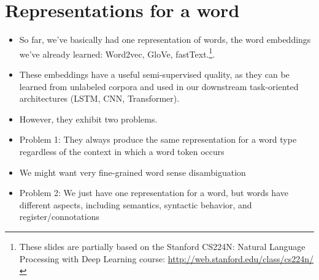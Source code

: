 \section{Representations for a word}
\begin{itemize}
\item So far, we've basically had one representation of words, the word embeddings we've already learned:  Word2vec, GloVe, fastText.\footnote{These slides are partially based on the Stanford CS224N: Natural Language Processing with Deep Learning course: \url{http://web.stanford.edu/class/cs224n/}}.
\item These embeddings have a useful semi-supervised quality, as they can be learned from unlabeled corpora and used in our downstream task-oriented architectures (LSTM, CNN, Transformer).

\item However, they exhibit two problems.
\item  Problem 1: They always produce the same representation for a word type regardless of the context in which a word token occurs
\item  We might want very fine-grained word sense disambiguation
\item Problem 2: We just have one representation for a word, but words have different aspects, including semantics, syntactic behavior, and register/connotations

 

\end{itemize}

